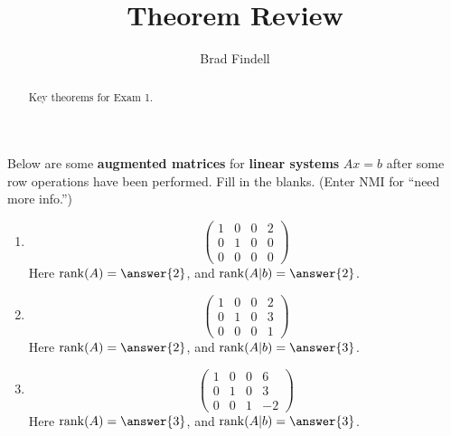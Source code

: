 \documentclass{ximera}
\title{Theorem Review}
\author{Brad Findell}
\begin{document}
\begin{abstract}
Key theorems for Exam 1.
\end{abstract}
\maketitle


\begin{problem}
  Below are some \textbf{augmented matrices} for \textbf{linear
    systems} $Ax = b$ after some row operations have been performed.
  Fill in the blanks.  (Enter NMI for ``need more info.'')
\begin{enumerate}
\item 
  \[
  \left(\begin{array}{ccc|c} 1 & 0 & 0 & 2 \\ 0 & 1 & 0 & 0 \\ 0 & 0 & 0 & 0
  \end{array}\right)
  \]
  Here ${\rm rank}(A) = \answer{2}$, and  ${\rm rank}(A|b) = \answer{2}$.  
  \begin{multipleChoice}
  \end{multipleChoice}
\item 
  \[
  \left(\begin{array}{ccc|c} 1 & 0 & 0 & 2 \\ 0 & 1 & 0 & 3 \\ 0 & 0 & 0 & 1
  \end{array}\right)
  \]
  Here ${\rm rank}(A) = \answer{2}$, and   ${\rm rank}(A|b) = \answer{3}$.
  \begin{multipleChoice}
  \end{multipleChoice}
\item 
    \[
  \left(\begin{array}{ccc|c}  1 &  0 &  0 &  6  \\  0 &  1 &  0 &  3  \\  0 &  0 &  1 &  -2  
  \end{array}\right)
  \]
  Here ${\rm rank}(A) = \answer{3}$, and  ${\rm rank}(A|b) = \answer{3}$.
    \begin{multipleChoice}
  \end{multipleChoice}
\end{enumerate}
 
\end{problem}
\end{document}

